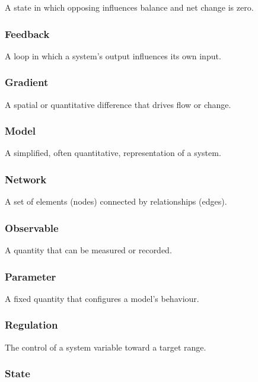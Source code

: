 \documentclass[
]{article}
\theoremstyle{plain}
\theoremstyle{definition}
\begin{document}
A state in which opposing influences balance and net change is zero.

\subsubsection{Feedback}\label{gl:feedback}

A loop in which a system's output influences its own input.

\subsubsection{Gradient}\label{gl:gradient}

A spatial or quantitative difference that drives flow or change.

\subsubsection{Model}\label{gl:model}

A simplified, often quantitative, representation of a system.

\subsubsection{Network}\label{gl:network}

A set of elements (nodes) connected by relationships (edges).

\subsubsection{Observable}\label{gl:observable}

A quantity that can be measured or recorded.

\subsubsection{Parameter}\label{gl:parameter}

A fixed quantity that configures a model's behaviour.

\subsubsection{Regulation}\label{gl:regulation}

The control of a system variable toward a target range.

\subsubsection{State}\label{gl:state}
\end{document}
